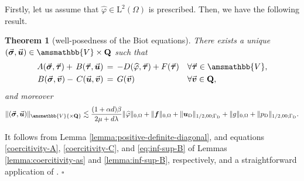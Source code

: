 \documentclass[fleqn,a4paper]{cas-sc}
\newcommand{\bu}{\boldsymbol{u}}
\newcommand{\bv}{\boldsymbol{v}}
\newcommand{\ff}{\boldsymbol{f}}
\newcommand{\0}{\boldsymbol{0}}
\newcommand\bQ{\mathbf{Q}}
\newcommand\bbV{\amsmathbb{V}}
\newcommand\rL{\mathrm{L}}
\newcommand\bsigma{\boldsymbol{\sigma}}
\newcommand\btau{\boldsymbol{\tau}}
\numberwithin{equation}{section}
\numberwithin{figure}{section}
\newtheorem{theorem}{Theorem}[section]
\newenvironment{proof}{\noindent{\it Proof.}}{\hfill$\square$}
\begin{document}
Firstly, let us assume that $\widehat{\varphi} \in \rL^2(\Omega)$ is prescribed. Then, we have the following result.

\begin{theorem}[well-posedness of the Biot equations]\label{th:well-posed-Biot}
 There exists a unique  $( \vec{\bsigma}, \vec{\bu}) \in \bbV\times \bQ$ such that 
 \begin{subequations}\label{eq:well-posed-Biot}
     \begin{align}
            A(\vec{\bsigma}, \vec{\btau})+\,B(\vec{\btau}, \vec{\bu}) &   \, =\, -D(\widehat{\varphi},\vec{\btau}) + F(\vec{\btau})  &&\forall \vec{\btau} \in \bbV,\\ 
    B(\vec{\bsigma},  \vec{\bv}) -\,C(\vec{\bu}, \vec{\bv}) &  \,=\, G(\vec{\bv})&&\forall \vec{\bv} \in \bQ,  
     \end{align}
 \end{subequations}
 and moreover 
 \[ \| ( \vec{\bsigma}, \vec{\bu}) \|_{\bbV{\times \bQ}} \lesssim  \frac{(1+\alpha d)\beta}{2\mu + d\lambda}\|\widehat{\varphi}\|_{0,\Omega} + \|\ff\|_{0,\Omega} + \|\bu_{\mathrm{D}}\|_{1/2,00;\Gamma_{\mathrm{D}}} + \|g\|_{0,\Omega} + \|p_{\mathrm{D}}\|_{1/2,00;\Gamma_{\mathrm{D}}}. \]
\end{theorem}
 \begin{proof}
   It follows from Lemma \ref{lemma:positive-definite-diagonal}, and equations \eqref{coercitivity-A}, \eqref{coercitivity-C}, and \eqref{eq:inf-sup-B} of Lemmas \ref{lemma:coercitivity-as} and \ref{lemma:inf-sup-B}, respectively, and a straightforward application of \cite[Theorem 4.3.1]{boffi13}.
\end{proof}  
\end{document}
